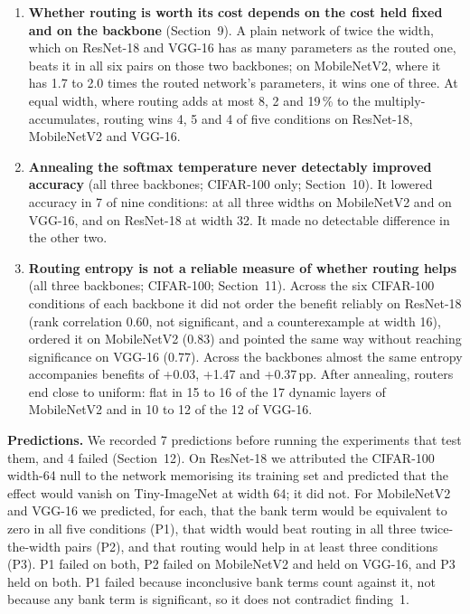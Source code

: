 \documentclass{article}
\begin{document}
\begin{enumerate}
MobileNetV2 and VGG-16 the comparison is inconclusive.
\item \textbf{Whether routing is worth its cost depends on the cost held
fixed and on the backbone} (Section~9). A plain network of
twice the width, which on ResNet-18 and VGG-16 has as many parameters as
the routed one, beats it in all six pairs on those two backbones; on
MobileNetV2, where it has 1.7 to 2.0 times the routed
network's parameters, it wins one of three. At equal width, where routing
adds at most 8, 2 and 19\,\% to the
multiply-accumulates, routing wins 4, 5 and 4
of five conditions on ResNet-18, MobileNetV2 and VGG-16.
\item \textbf{Annealing the softmax temperature never detectably improved
accuracy} (all three backbones; CIFAR-100 only; Section~10).
It lowered accuracy in 7 of nine conditions: at all three
widths on MobileNetV2 and on VGG-16, and on ResNet-18 at width 32. It made
no detectable difference in the other two.
\item \textbf{Routing entropy is not a reliable measure of whether
routing helps} (all three backbones; CIFAR-100; Section~11).
Across the six CIFAR-100 conditions of each backbone it did not order the
benefit reliably on ResNet-18 (rank correlation 0.60, not significant,
and a counterexample at width 16), ordered it on MobileNetV2 (0.83)
and pointed the same way without reaching significance on VGG-16
(0.77).
Across the backbones almost the same entropy accompanies benefits of
+0.03, +1.47 and +0.37\,pp. After annealing, routers end close
to uniform: flat in 15 to 16 of the 17
dynamic layers of MobileNetV2 and in 10 to 12 of the
12 of VGG-16.
\end{enumerate}

\textbf{Predictions.}  We recorded 7 predictions before running
the experiments that test them, and 4 failed
(Section~12). On ResNet-18 we attributed the CIFAR-100
width-64 null to the network memorising its training set and predicted
that the effect would vanish on Tiny-ImageNet at width 64; it did not. For
MobileNetV2 and VGG-16 we predicted, for each, that the bank term would be
equivalent to zero in all five conditions (P1), that width would beat
routing in all three twice-the-width pairs (P2), and that routing would
help in at least three conditions (P3). P1 failed on both, P2 failed on
MobileNetV2 and held on VGG-16, and P3 held on both. P1 failed because
inconclusive bank terms count against it, not because any bank term is
significant, so it does not contradict finding~1.
\end{document}
